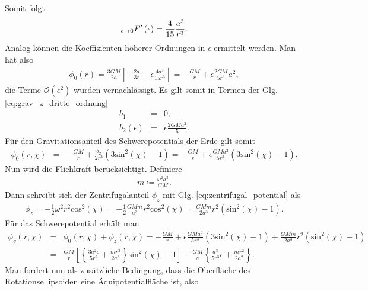 \documentclass{book}
\renewcommand{\sin}{\text{sin}}
\renewcommand{\cos}{\text{cos}}
\let\lim\relax
\DeclareMathOperator*{\lim}{\text{lim}}
\begin{document}
%
Somit folgt
%
\begin{eqnarray}
\lim_{\epsilon\to 0} F'\left(\epsilon\right) = \frac{4}{15}\frac{a^3}{r^3}.
\end{eqnarray}
%
Analog können die Koeffizienten höherer Ordnungen in $\epsilon$ ermittelt werden. Man hat also
%
\begin{eqnarray}
\phi_0\left(r\right) = \frac{3GM}{2a}\left[-\frac{2a}{3r} + \epsilon\frac{4a^3}{15r^3}\right] = -\frac{GM}{r} + \epsilon\frac{2GM}{5r^3}a^2, 
\end{eqnarray}
%
die Terme $\mathcal{O}\left(\epsilon^2\right)$ wurden vernachlässigt. Es gilt somit in Termen der Glg. \eqref{eq:grav_z_dritte_ordnung}
%
\begin{eqnarray}
b_1 & = & 0,\\
b_2\left(\epsilon\right) & = & \epsilon\frac{2GMa^2}{5}.
\end{eqnarray}
%
Für den Gravitationsanteil des Schwerepotentials der Erde gilt somit
%
\begin{eqnarray}
\phi_0\left(r, \chi\right) & = & -\frac{GM}{r} + \frac{b_2}{2r^3}\left(3\sin^2\left(\chi\right) - 1\right) = -\frac{GM}{r} + \epsilon\frac{GMa^2}{5r^3}\left(3\sin^2\left(\chi\right) - 1\right).
\end{eqnarray}
%
Nun wird die Fliehkraft berücksichtigt. Definiere
%
\begin{eqnarray}
m \coloneqq \frac{\omega^2a^3}{GM}.
\end{eqnarray}
%
Dann schreibt sich der Zentrifugalanteil $\phi_z$ mit Glg. \eqref{eq:zentrifugal_potential} als
%
\begin{eqnarray}
\phi_z = -\frac{1}{2}\omega^2r^2\cos^2\left(\chi\right) = -\frac{1}{2}\frac{GMm}{a^3}r^2\cos^2\left(\chi\right) = \frac{GMm}{2a^3}r^2\left(\sin^2\left(\chi\right) - 1\right).
\end{eqnarray}
%
Für das Schwerepotential erhält man
%
\begin{eqnarray}
\phi_g\left(r, \chi\right) & = & \phi_0\left(r, \chi\right) + \phi_z\left(r, \chi\right) =  - \frac{GM}{r} + \epsilon\frac{GMa^2}{5r^3}\left(3\sin^2\left(\chi\right) - 1\right) + \frac{GMm}{2a^3}r^2\left(\sin^2\left(\chi\right) - 1\right)\nonumber\\
& = & \frac{GM}{r}\left[\left\{\frac{3a^2\epsilon}{5r^2} + \frac{mr^3}{2a^3}\right\}\sin^2\left(\chi\right) - 1\right] - \frac{GM}{a}\left\{\frac{a^3}{5r^3}\epsilon + \frac{mr^2}{2a^2}\right\}.
\end{eqnarray}
%
Man fordert nun als zusätzliche Bedingung, dass die Oberfläche des Rotationsellipsoiden eine Äquipotentialfläche ist, also
\end{document}
